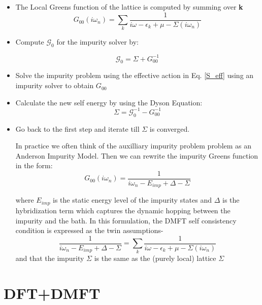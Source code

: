 \documentclass[12pt,letter]{article}
\begin{document}
\begin{itemize}
\item The Local Greens function of the lattice is computed by summing over \textbf{k}
\begin{equation}
G_{00}(i\omega_n)= \sum_k \dfrac{1}{i\omega -\epsilon_k +\mu -\Sigma(i\omega_n)}
\end{equation}
\item Compute $\mathcal{G}_0$ for the impurity solver by:

\begin{equation}
\mathcal{G}_0=\Sigma + G_{00}^{-1}
\end{equation}

\item Solve the impurity problem using the effective action in Eq. \ref{S_eff} using an impurity solver to obtain $G_{00}$

\item Calculate the new self energy by using the Dyson Equation:
\begin{equation}
\Sigma= \mathcal{G}_0^{-1} -G_{00}^{-1}
\end{equation}

\item Go back to the first step and iterate till  $\Sigma$ is converged.

In practice we often think of the auxilliary impurity problem problem as an Anderson Impurity Model. Then we can rewrite the impurity Greens function in the form:
\begin{equation}
G_{00}(i \omega_n)= \dfrac{1}{i \omega_n -E_{imp}+ \Delta- \Sigma}
\end{equation}

where $E_{imp}$ is the static energy level of the impurity states and $\Delta$ is the hybridization term which captures the dynamic hopping between the impurity and the bath. In this formulation, the DMFT self consistency condition is expressed as the twin assumptions-
\begin{equation}
\dfrac{1}{i \omega_n -E_{imp}+ \Delta- \Sigma}=  \sum_k \dfrac{1}{i\omega -\epsilon_k +\mu -\Sigma(i\omega_n)}
\end{equation}
and that the impurity  $\Sigma$ is the same as the (purely local) lattice $\Sigma$
\end{itemize}  
%

\pagebreak
\section{DFT+DMFT}
\end{document}
